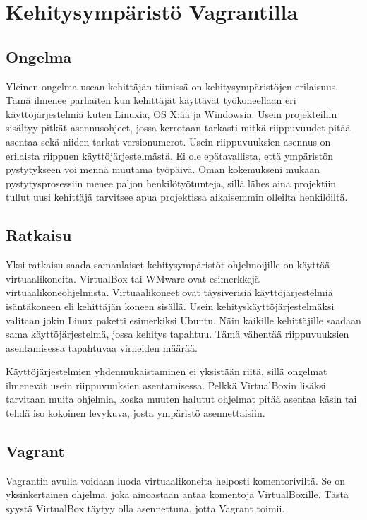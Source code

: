 \chapter{Kehitysympäristö Vagrantilla}

\section{Ongelma}
Yleinen ongelma usean kehittäjän tiimissä on kehitysympäristöjen erilaisuus. Tämä ilmenee parhaiten kun kehittäjät käyttävät työkoneellaan eri käyttöjärjestelmiä kuten Linuxia, OS X:ää ja Windowsia. Usein projekteihin sisältyy pitkät asennusohjeet, jossa kerrotaan tarkasti mitkä riippuvuudet pitää asentaa sekä niiden tarkat versionumerot. Usein riippuvuuksien asennus on erilaista riippuen käyttöjärjestelmästä. Ei ole epätavallista, että ympäristön pystytykseen voi mennä muutama työpäivä. Oman kokemukseni mukaan pystytysprosessiin menee paljon henkilötyötunteja, sillä lähes aina projektiin tullut uusi kehittäjä tarvitsee apua projektissa aikaisemmin olleilta henkilöiltä.

\section{Ratkaisu}
Yksi ratkaisu saada samanlaiset kehitysympäristöt ohjelmoijille on käyttää virtuaalikoneita. VirtualBox tai WMware ovat esimerkkejä virtuaalikoneohjelmista. Virtuaalikoneet ovat täysiverisiä käyttöjärjestelmiä isäntäkoneen eli kehittäjän koneen sisällä. Usein kehityskäyttöjärjestelmäksi valitaan jokin Linux paketti esimerkiksi Ubuntu. Näin kaikille kehittäjille saadaan sama käyttöjärjestelmä, jossa kehitys tapahtuu. Tämä vähentää riippuvuuksien asentamisessa tapahtuvaa virheiden määrää.

Käyttöjärjestelmien yhdenmukaistaminen ei yksistään riitä, sillä ongelmat ilmenevät usein riippuvuuksien asentamisessa. Pelkkä VirtualBoxin lisäksi tarvitaan muita ohjelmia, koska muuten halutut ohjelmat pitää asentaa käsin tai tehdä iso kokoinen levykuva, josta ympäristö asennettaisiin.

\section{Vagrant}
Vagrantin avulla voidaan luoda virtuaalikoneita helposti komentoriviltä. Se on yksinkertainen ohjelma, joka ainoastaan antaa komentoja VirtualBoxille. Tästä syystä VirtualBox täytyy olla asennettuna, jotta Vagrant toimii.

